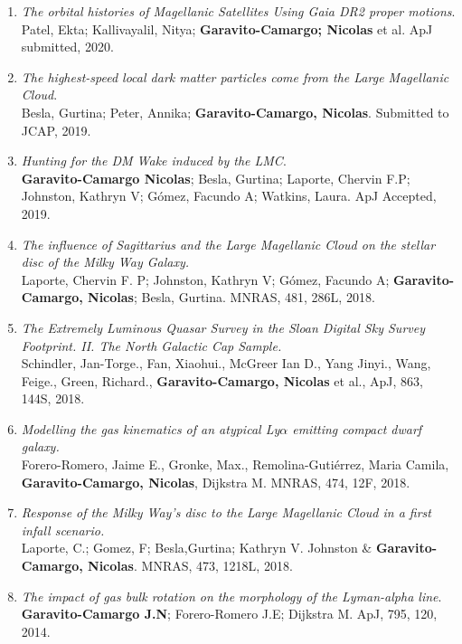\documentclass[UTF8]{article}
\begin{document}
\begin{enumerate}
\item \textit{The orbital histories of Magellanic Satellites Using Gaia DR2
  proper motions}. \\
  Patel, Ekta; Kallivayalil, Nitya; \textbf{Garavito-Camargo; Nicolas} et al. ApJ submitted, 2020.
\item \textit{The highest-speed local dark matter particles come from the Large
  Magellanic Cloud}. \\
  Besla, Gurtina; Peter, Annika; \textbf{Garavito-Camargo, Nicolas}. Submitted to JCAP, 2019.
\item \textit{Hunting for the DM Wake induced by the LMC}.\\
  \textbf{Garavito-Camargo Nicolas}; Besla, Gurtina; Laporte, Chervin F.P;
  Johnston, Kathryn V; G\'omez, Facundo A; Watkins, Laura. ApJ Accepted, 2019.
\item \textit{The influence of Sagittarius and the Large Magellanic Cloud on the
  stellar disc of the Milky Way Galaxy.}\\
  Laporte, Chervin F. P; Johnston, Kathryn V; G\'omez, Facundo A; \textbf{Garavito-Camargo, Nicolas}; Besla,
    Gurtina. MNRAS, 481, 286L, 2018.
\item \textit{The Extremely Luminous Quasar Survey in the Sloan Digital Sky
  Survey Footprint. II. The North Galactic Cap Sample.}\\ Schindler, Jan-Torge., Fan, Xiaohui., McGreer Ian D., Yang Jinyi., Wang, Feige., Green, Richard., \textbf{Garavito-Camargo, Nicolas} et al., ApJ, 863, 144S, 2018.
\item \textit{Modelling the gas kinematics of an atypical Ly$\alpha$
emitting compact dwarf galaxy.}\\  Forero-Romero, Jaime E., Gronke, Max., Remolina-Gutiérrez, Maria Camila, \textbf{Garavito-Camargo, Nicolas}, Dijkstra M. MNRAS, 474, 12F, 2018.
\item \textit{Response of the Milky Way's disc to the Large Magellanic Cloud in
  a first infall scenario.}\\ Laporte, C.; Gomez, F; Besla,Gurtina; Kathryn V. Johnston \& \textbf{Garavito-Camargo, Nicolas}. MNRAS, 473, 1218L, 2018.
 \item \textit{The impact of gas bulk rotation on the morphology of the
   Lyman-alpha line}.\\ \textbf{Garavito-Camargo J.N}; Forero-Romero J.E;
    Dijkstra M. ApJ, 795, 120, 2014.
\end{enumerate}
\end{document}

